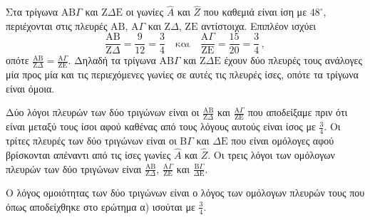 \begin{alist}
    \item Στα τρίγωνα $\mathrm{AB}\Gamma$ και $\mathrm{Z}\Delta\mathrm{E}$ οι γωνίες $\hat{A}$ και $\hat{Z}$ που καθεμιά είναι ίση με $48^\circ$, περιέχονται στις πλευρές $\mathrm{AB}$, $\mathrm{A}\Gamma$ και $\mathrm{Z}\Delta$, $\mathrm{ZE}$ αντίστοιχα. Επιπλέον ισχύει
    \[ \frac{\mathrm{AB}}{\mathrm{Z}\Delta} = \frac{9}{12} = \frac{3}{4} \quad \text{και} \quad \frac{\mathrm{A}\Gamma}{\mathrm{ZE}} = \frac{15}{20} = \frac{3}{4} \, , \]
    οπότε $\frac{\mathrm{AB}}{\mathrm{Z}\Delta} = \frac{\mathrm{A}\Gamma}{\mathrm{ZE}}$. Δηλαδή τα τρίγωνα $\mathrm{AB}\Gamma$ και $\mathrm{Z}\Delta\mathrm{E}$ έχουν δύο πλευρές τους ανάλογες μία προς μία και τις περιεχόμενες γωνίες σε αυτές τις πλευρές ίσες, οπότε τα τρίγωνα είναι όμοια.

    \item
    \begin{rlist}
        \item Δύο λόγοι πλευρών των δύο τριγώνων είναι οι $\frac{\mathrm{AB}}{\mathrm{Z}\Delta}$ και $\frac{\mathrm{A}\Gamma}{\mathrm{ZE}}$ που αποδείξαμε πριν ότι είναι μεταξύ τους ίσοι αφού καθένας από τους λόγους αυτούς είναι ίσος με $\frac{3}{4}$. Οι τρίτες πλευρές των δύο τριγώνων είναι οι $\mathrm{B}\Gamma$ και $\Delta\mathrm{E}$ που είναι ομόλογες αφού βρίσκονται απέναντι από τις ίσες γωνίες $\hat{A}$ και $\hat{Z}$. Οι τρεις λόγοι των ομόλογων πλευρών των δύο τριγώνων είναι $\frac{\mathrm{AB}}{\mathrm{Z}\Delta}$, $\frac{\mathrm{A}\Gamma}{\mathrm{ZE}}$ και $\frac{\mathrm{B}\Gamma}{\Delta\mathrm{E}}$.
        \item Ο λόγος ομοιότητας των δύο τριγώνων είναι ο λόγος των ομόλογων πλευρών τους που όπως αποδείχθηκε στο ερώτημα α) ισούται με $\frac{3}{4}$.
    \end{rlist}
\end{alist}